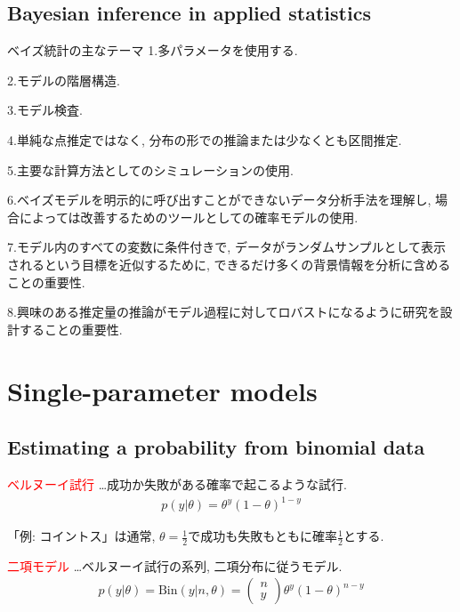 \documentclass[11pt,a4pape,dvipdfmx]{jarticle}
\newcommand{\eqn}[1]{\begin{align*}#1\end{align*}}
\newcommand{\tcr}[1]{\textcolor{red}{#1}}
\begin{document}
\subsection{Bayesian inference in applied statistics}
\begin{itembox}[l]{ベイズ統計の主なテーマ}
1.多パラメータを使用する.

2.モデルの階層構造.

3.モデル検査.

4.単純な点推定ではなく, 分布の形での推論または少なくとも区間推定.

5.主要な計算方法としてのシミュレーションの使用.

6.ベイズモデルを明示的に呼び出すことができないデータ分析手法を理解し, 場合によっては改善するためのツールとしての確率モデルの使用.

7.モデル内のすべての変数に条件付きで, データがランダムサンプルとして表示されるという目標を近似するために, できるだけ多くの背景情報を分析に含めることの重要性.

8.興味のある推定量の推論がモデル過程に対してロバストになるように研究を設計することの重要性.
\end{itembox}

\section{Single-parameter models}

\subsection{Estimating a probability from binomial data}
\begin{itembox}[l]{\tcr{ベルヌーイ試行}}
…成功か失敗がある確率で起こるような試行.
\eqn{p(y|\theta)=\theta^y(1-\theta)^{1-y}}
\end{itembox}

「例: コイントス」は通常, $\theta=\tfrac{1}{2}$で成功も失敗もともに確率$\tfrac{1}{2}$とする.


\begin{itembox}[l]{\tcr{二項モデル}}
…ベルヌーイ試行の系列, 二項分布に従うモデル.
\eqn{p(y|\theta)=\text{Bin}(y|n,\theta)=\left(\begin{array}{c}n\\y\end{array}\right)\theta^y(1-\theta)^{n-y}}
\end{itembox}
\end{document}
